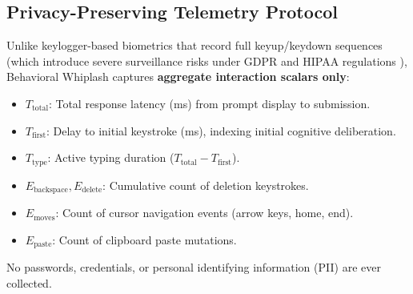 \documentclass[10pt,a4paper]{article}
\begin{document}
\subsection*{Privacy-Preserving Telemetry Protocol}
Unlike keylogger-based biometrics that record full keyup/keydown sequences (which introduce severe surveillance risks under GDPR and HIPAA regulations \cite{voigt2017gdpr,hipaa1996}), Behavioral Whiplash captures \textbf{aggregate interaction scalars only}:
\begin{itemize}
    \item $T_{\text{total}}$: Total response latency (ms) from prompt display to submission.
    \item $T_{\text{first}}$: Delay to initial keystroke (ms), indexing initial cognitive deliberation.
    \item $T_{\text{type}}$: Active typing duration ($T_{\text{total}} - T_{\text{first}}$).
    \item $E_{\text{backspace}}, E_{\text{delete}}$: Cumulative count of deletion keystrokes.
    \item $E_{\text{moves}}$: Count of cursor navigation events (arrow keys, home, end).
    \item $E_{\text{paste}}$: Count of clipboard paste mutations.
\end{itemize}
No passwords, credentials, or personal identifying information (PII) are ever collected.
\end{document}
